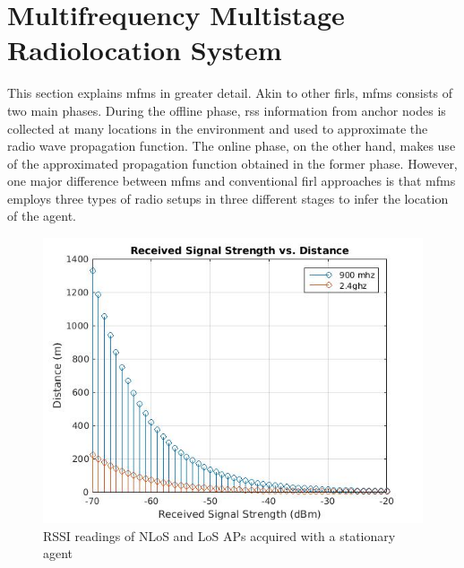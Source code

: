 \section{Multifrequency Multistage Radiolocation System}
\label{sec:mfms}
    This section explains \gls{mfms} in greater detail.
    Akin to other \gls{firl}s, \gls{mfms} consists of two main phases.
    During the offline phase, \gls{rss} information from anchor nodes is collected at many locations in the environment and used to approximate the radio wave propagation function.
    The online phase, on the other hand, makes use of the approximated propagation function obtained in the former phase.
    However, one major difference between \gls{mfms} and conventional \gls{firl} approaches is that \gls{mfms} employs three types of radio setups in three different stages to infer the location of the agent.

    \begin{figure}[thpb]
        \centering
        \includegraphics[width=\linewidth]{figures/rss-vs-distance.jpg}
        \caption{\label{fig:log-distance}RSSI readings of NLoS and LoS APs acquired with a stationary agent}
    \end{figure}

